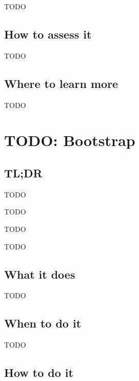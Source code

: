 \documentclass[
]{book}
\providecommand{\tightlist}{%
  \setlength{\itemsep}{0pt}\setlength{\parskip}{0pt}}
\begin{document}
TODO

\hypertarget{how-to-assess-it-9}{%
\section{How to assess it}\label{how-to-assess-it-9}}

TODO

\hypertarget{where-to-learn-more-9}{%
\section{Where to learn more}\label{where-to-learn-more-9}}

TODO

\hypertarget{bootstrap}{%
\chapter{TODO: Bootstrap}\label{bootstrap}}

\hypertarget{tldr-10}{%
\section{TL;DR}\label{tldr-10}}

\begin{description}
\tightlist
\item[What it does]
TODO
\item[When to do it]
TODO
\item[How to do it]
TODO
\item[How to assess it]
TODO
\end{description}

\hypertarget{what-it-does-10}{%
\section{What it does}\label{what-it-does-10}}

TODO

\hypertarget{when-to-do-it-10}{%
\section{When to do it}\label{when-to-do-it-10}}

TODO

\hypertarget{how-to-do-it-10}{%
\section{How to do it}\label{how-to-do-it-10}}
\end{document}
